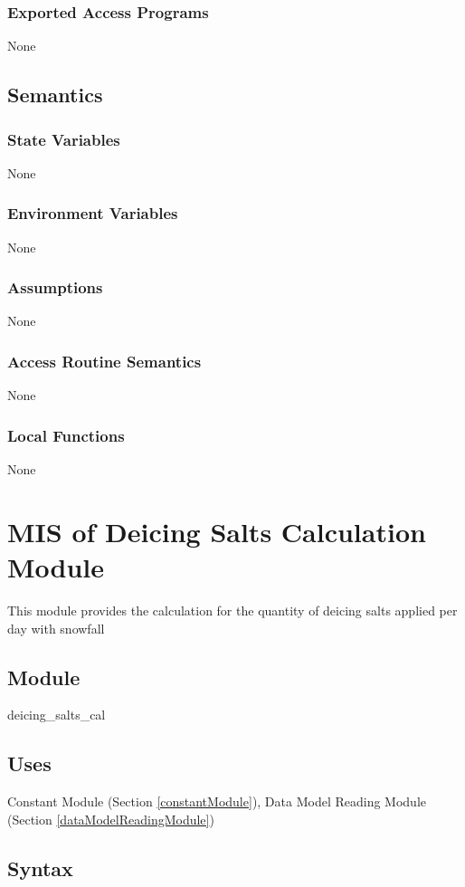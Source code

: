 \documentclass[12pt, titlepage]{article}
\begin{document}
\subsubsection{Exported Access Programs}
None

\subsection{Semantics}
\subsubsection{State Variables}
None
\subsubsection{Environment Variables}
None
\subsubsection{Assumptions}
None
\subsubsection{Access Routine Semantics}
None

\subsubsection{Local Functions}
None
\newpage

\section{MIS of Deicing Salts Calculation Module} \label{deicingSaltsCalculationModule}
This module provides the calculation for the quantity of deicing salts applied per day with snowfall

\subsection{Module}
deicing\_salts\_cal

\subsection{Uses}

Constant Module (Section \ref{constantModule}), Data Model Reading Module (Section \ref{dataModelReadingModule})


\subsection{Syntax}
\end{document}
